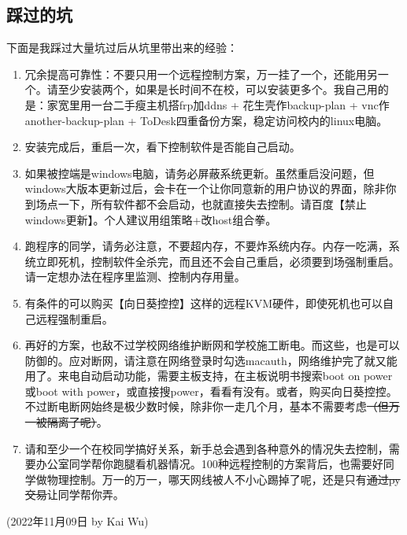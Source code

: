 \subsection{踩过的坑}
下面是我踩过大量坑过后从坑里带出来的经验：
\begin{enumerate}
    \item 冗余提高可靠性：不要只用一个远程控制方案，万一挂了一个，还能用另一个。请至少安装两个，如果是长时间不在校，可以安装更多个。我自己用的是：家宽里用一台二手瘦主机搭frp加ddns + 花生壳作backup-plan + vnc作another-backup-plan + ToDesk四重备份方案，稳定访问校内的linux电脑。
    \item 安装完成后，重启一次，看下控制软件是否能自己启动。
    \item 如果被控端是windows电脑，请务必屏蔽系统更新。虽然重启没问题，但windows大版本更新过后，会卡在一个让你同意新的用户协议的界面，除非你到场点一下，所有软件都不会启动，也就直接失去控制。请百度【禁止windows更新】。个人建议用组策略+改host组合拳。
    \item 跑程序的同学，请务必注意，不要超内存，不要炸系统内存。内存一吃满，系统立即死机，控制软件全杀完，而且还不会自己重启，必须要到场强制重启。请一定想办法在程序里监测、控制内存用量。
    \item 有条件的可以购买【向日葵控控】这样的远程KVM硬件，即使死机也可以自己远程强制重启。
    \item 再好的方案，也敌不过学校网络维护断网和学校施工断电。而这些，也是可以防御的。应对断网，请注意在网络登录时勾选macauth，网络维护完了就又能用了。来电自动启动功能，需要主板支持，在主板说明书搜索boot on power或boot with power，或直接搜power，看看有没有。或者，购买向日葵控控。不过断电断网始终是极少数时候，除非你一走几个月，基本不需要考虑\sout{（但万一被隔离了呢）}。
    \item 请和至少一个在校同学搞好关系，新手总会遇到各种意外的情况失去控制，需要办公室同学帮你跑腿看机器情况。100种远程控制的方案背后，也需要好同学做物理控制。万一的万一，哪天网线被人不小心踢掉了呢，还是只有\sout{通过py交易}让同学帮你弄。
\end{enumerate}

\begin{flushright}
(2022年11月09日 by Kai Wu)
\end{flushright}





% 
